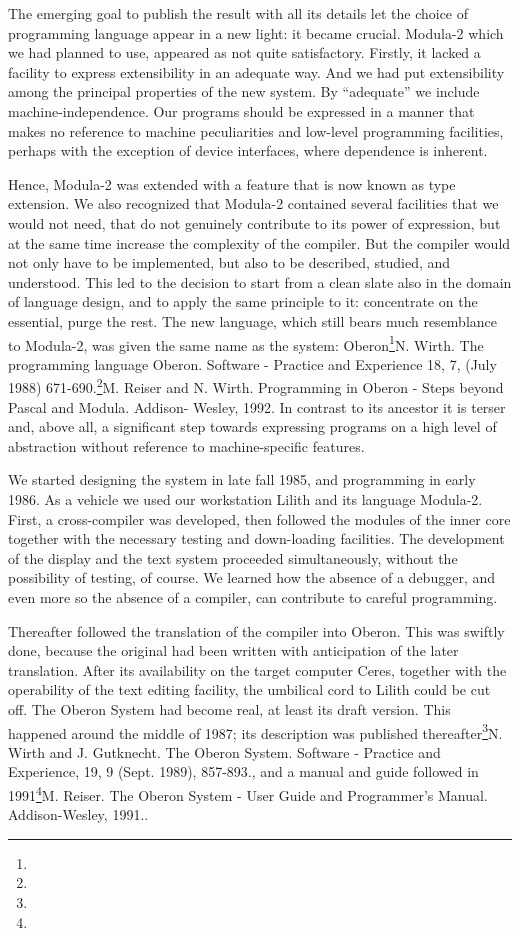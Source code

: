 The emerging goal to publish the result with all its details let the
choice of programming language appear in a new light: it became
crucial. Modula-2 which we had planned to use, appeared as not quite
satisfactory. Firstly, it lacked a facility to express extensibility
in an adequate way. And we had put extensibility among the principal
properties of the new system. By ``adequate'' we include
machine-independence. Our programs should be expressed in a manner
that makes no reference to machine peculiarities and low-level
programming facilities, perhaps with the exception of device
interfaces, where dependence is inherent.

Hence, Modula-2 was extended with a feature that is now known as type
extension. We also recognized that Modula-2 contained several
facilities that we would not need, that do not genuinely contribute to
its power of expression, but at the same time increase the complexity
of the compiler. But the compiler would not only have to be
implemented, but also to be described, studied, and understood. This
led to the decision to start from a clean slate also in the domain of
language design, and to apply the same principle to it: concentrate on
the essential, purge the rest. The new language, which still bears
much resemblance to Modula-2, was given the same name as the system:
Oberon\footnote{{\mc[1]}}{N. Wirth. The programming language Oberon. Software - Practice and Experience 18, 7, (July 1988) 671-690.}\footnote{{\mc[2]}}{M. Reiser and N. Wirth. Programming in Oberon - Steps beyond Pascal and Modula. Addison- Wesley, 1992.}
In contrast to its ancestor it is terser and, above
all, a significant step towards expressing programs on a high level of
abstraction without reference to machine-specific features.

We started designing the system in late fall 1985, and programming in
early 1986. As a vehicle we used our workstation Lilith and its
language Modula-2. First, a cross-compiler was developed, then
followed the modules of the inner core together with the necessary
testing and down-loading facilities. The development of the display
and the text system proceeded simultaneously, without the possibility
of testing, of course. We learned how the absence of a debugger, and
even more so the absence of a compiler, can contribute to careful
programming.

Thereafter followed the translation of the compiler into Oberon. This
was swiftly done, because the original had been written with
anticipation of the later translation. After its availability on the
target computer Ceres, together with the operability of the text
editing facility, the umbilical cord to Lilith could be cut off. The
Oberon System had become real, at least its draft version. This
happened around the middle of 1987; its description was published
thereafter\footnote{{\mc[3]}}{N. Wirth and J. Gutknecht. The Oberon System. Software - Practice and Experience, 19, 9 (Sept. 1989), 857-893.}, and a manual and guide followed in 1991\footnote{{\mc[5]}}{M. Reiser. The Oberon System - User Guide and Programmer's Manual. Addison-Wesley, 1991.}.

